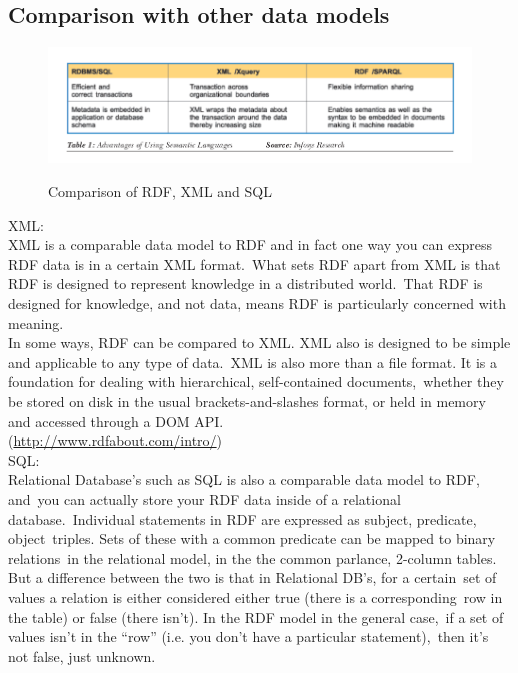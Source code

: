 \documentclass[DIV=calc, paper=a4, fontsize=12pt, onecolumn]{scrartcl}	 %
\begin{document}
  \subsection{Comparison with other data models}

  \begin{figure}[ht!]
    \centering
    \includegraphics[scale=0.5]{sqlrdf.png}
    \caption{Comparison of RDF, XML and SQL}
    \citep[Fig.~1]{parachuri2008role}
    \label{fig:nwhin}
  \end{figure}  

  XML:\\

  XML is a comparable data model to RDF and in fact one way you can express RDF data is in a certain XML format.\
  What sets RDF apart from XML is that RDF is designed to represent knowledge in a distributed world.\
  That RDF is designed for knowledge, and not data, means RDF is particularly concerned with meaning.\\

  In some ways, RDF can be compared to XML. XML also is designed to be simple and applicable to any type of data.\
  XML is also more than a file format. It is a foundation for dealing with hierarchical, self-contained documents,\
  whether they be stored on disk in the usual brackets-and-slashes format, or held in memory and accessed through a DOM API.\\
  (\url{http://www.rdfabout.com/intro/})\\

  SQL: \\

  Relational Database’s such as SQL is also a comparable data model to RDF, and\
  you can actually store your RDF data inside of a relational database.\
  Individual statements in RDF are expressed as subject, predicate, object\ 
  triples. Sets of these with a common predicate can be mapped to binary relations\
  in the relational model, in the the common parlance, 2-column tables.\\

  But a difference between the two is that in Relational DB's, for a certain\
  set of values a relation is either considered either true (there is a corresponding\
  row in the table) or false (there isn't). In the RDF model in the general case,\
  if a set of values isn't in the ``row'' (i.e. you don't have a particular statement),\
  then it's not false, just unknown.\\
\end{document}
